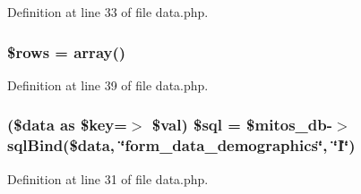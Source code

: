 \-Definition at line 33 of file data.\-php.

\hypertarget{patientfile_2new_2data_8php_ace2ec39e7df3899fa8df9640ec274b03}{
\subsubsection[{\$rows}]{\setlength{\rightskip}{0pt plus 5cm}\$rows = array()}}\label{patientfile_2new_2data_8php_ace2ec39e7df3899fa8df9640ec274b03}


\-Definition at line 39 of file data.\-php.

\hypertarget{patientfile_2new_2data_8php_ac002a22b17adea1f24adf8019e0ea6e9}{
\subsubsection[{\$sql}]{ (\$data as \$key=$>$ \$val) \$sql = \$mitos\-\_\-db-\/$>$sql\-Bind(\$data, \char`\"{}form\-\_\-data\-\_\-demographics\char`\"{}, \char`\"{}\-I\char`\"{})}}\label{patientfile_2new_2data_8php_ac002a22b17adea1f24adf8019e0ea6e9}


\-Definition at line 31 of file data.\-php.

